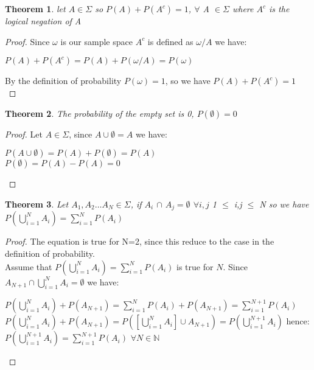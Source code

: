 \documentclass[paper=9in:6in,pagesize=pdftex,headinclude=on,footinclude=on,10pt,bibtotoc,pointlessnumbers,normalheadings,DIV=9,twoside=false]{scrbook}
\newtheorem{theorem}{Theorem}
\begin{document}
\date{}




\begin{theorem} 
  let $A \in \Sigma$ so $P(A)+P(A^c)=1 $, $ \forall $ A $\in \Sigma$  where $A^c$ is the logical negation of A\\
  \end{theorem}
  
  \begin{proof}  Since $\omega$ is our sample space $A^c$ is defined as $\omega/A$ we have: 
  
  \begin{center}
  $P(A)+P(A^c)=P(A)+P(\omega/A)=P(\omega)$
  \end{center}
  
  By the definition of probability $P(\omega)=1$, so we have $P(A)+P(A^c)=1  $\\
  \end{proof}
  
  \begin{theorem} The probability of the empty set is 0, $P(\emptyset)=0$\\
  \end{theorem}
  
  \begin{proof} Let $A \in \Sigma$, since $A\cup\emptyset=A$ we have:
  
  \begin{center} $P(A\cup\emptyset)=P(A)+P(\emptyset)=P(A)$\\ $P(\emptyset)=P(A)-P(A)=0$
  \end{center}
  \end{proof}
  
  \begin{theorem} Let $A_1, A_2 \dots{} A_N \in \Sigma$, if $A_i$ $\cap$ $A_j=\emptyset$ $\forall i,j$  1 $\leq$ i,j $ \leq$ N so we have $P(\bigcup\limits_{i = 1 }^N A_i) = 	\sum_{i=1}^{N} P(A_i)$\\
  \end{theorem}
  
  \begin{proof}The equation is true for N=2, since this reduce to the case in the definition of probability. \\
  
 Assume that $P(\bigcup\limits_{i = 1 }^N A_i) = 	\sum_{i=1}^{N} P(A_i)$ is true for $N$. Since $A_{N+1} \cap \bigcup\limits_{i = 1 }^N A_i=\emptyset$ we have:
 
 \begin{center} $P(\bigcup\limits_{i = 1 }^N A_i)+P(A_{N+1})=\sum_{i=1}^{N} P(A_i)  +P(A_{N+1}) =\sum_{i=1}^{N+1} P(A_i)$ \\ $P(\bigcup\limits_{i = 1 }^N A_i)+P(A_{N+1})= P([\bigcup\limits_{i = 1 }^N A_i] \cup A_{N+1}) = P(\bigcup\limits_{i = 1 }^{N+1} A_i)$ hence:\\ $P(\bigcup\limits_{i = 1 }^{N+1} A_i)=\sum_{i=1}^{N+1} P(A_i)$ $\forall N \in  \mathbb{N}$

 
 \end{center}




\end{proof}
\end{document}
